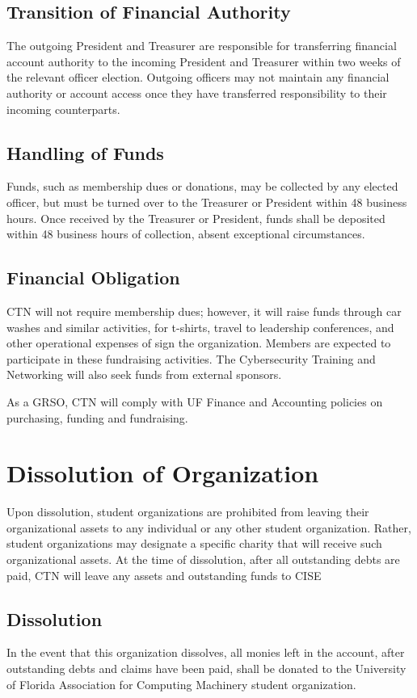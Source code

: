 \documentclass{article}
\def\clubname{CTN }
\def\clubfullname{Cybersecurity Training and Networking }
\begin{document}
\subsection{Transition of Financial Authority}
The outgoing President and Treasurer are responsible for transferring financial account authority to the incoming President and Treasurer within two weeks of the relevant officer election. Outgoing officers may not maintain any financial authority or account access once they have transferred responsibility to their incoming counterparts.

\subsection{Handling of Funds}
Funds, such as membership dues or donations, may be collected by any elected officer, but must be turned over to the Treasurer or President within 48 business hours. Once received by the Treasurer or President, funds shall be deposited within 48 business hours of collection, absent exceptional circumstances.

\subsection{Financial Obligation}
\clubname will not require membership dues; however, it will raise funds through car washes and similar activities, for t-shirts, travel to leadership conferences, and other operational expenses of sign the organization. Members are expected to participate in these fundraising activities. The \clubfullname will also seek funds from external sponsors.

As a GRSO, \clubname will comply with UF Finance and Accounting policies on purchasing, funding and fundraising.


\section{Dissolution of Organization}
Upon dissolution, student organizations are prohibited from leaving their organizational assets to any individual or any other student organization. Rather, student organizations may designate a specific charity that will receive such organizational assets. At the time of dissolution, after all outstanding debts are paid, \clubname will leave any assets and outstanding funds to CISE

\subsection{Dissolution}
In the event that this organization dissolves, all monies left in the account, after outstanding debts and claims have been paid, shall be donated to the University of Florida Association for Computing Machinery student organization.
\end{document}
